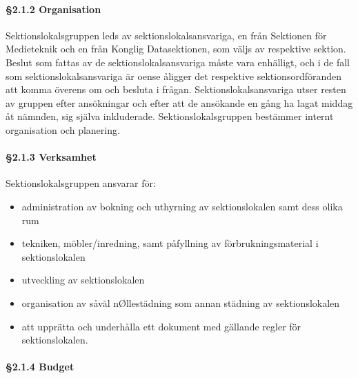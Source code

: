 \paragraph{§2.1.2 Organisation}

Sektionslokalsgruppen leds av sektionslokalsansvariga, en från Sektionen för Medieteknik och en från Konglig Datasektionen, som väljs av respektive sektion. Beslut som fattas av de sektionslokalsansvariga måste vara enhälligt, och i de fall som sektionslokalsansvariga är oense åligger det respektive sektionsordföranden att komma överens
om och besluta i frågan. Sektionslokalsansvariga utser resten av gruppen efter ansökningar och efter att de ansökande en gång ha lagat middag åt nämnden, sig själva inkluderade. Sektionslokalsgruppen bestämmer internt organisation och planering.

\paragraph{§2.1.3 Verksamhet}

Sektionslokalsgruppen ansvarar för:

\begin{itemize}
  \item administration av bokning och uthyrning av sektionslokalen samt dess olika rum
\end{itemize}

\begin{itemize}
  \item tekniken, möbler/inredning, samt påfyllning av förbrukningsmaterial i sektionslokalen
\end{itemize}

\begin{itemize}
  \item utveckling av sektionslokalen
\end{itemize}

\begin{itemize}
  \item organisation av såväl nØllestädning som annan städning av sektionslokalen
\end{itemize}

\begin{itemize}
  \item att upprätta och underhålla ett dokument med gällande regler för sektionslokalen.
\end{itemize}

\paragraph{§2.1.4 Budget}

